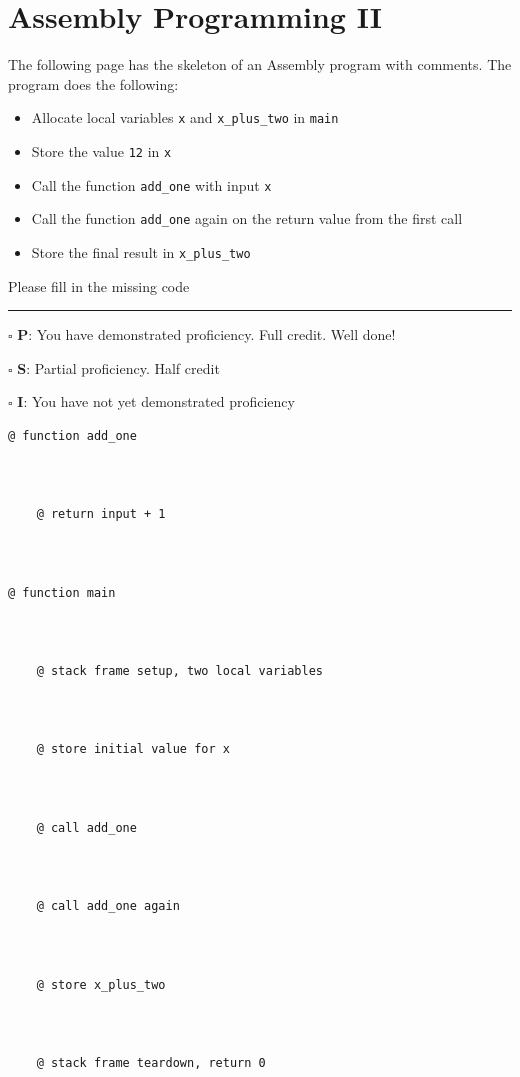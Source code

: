 \documentclass[12pt]{article}
\begin{document}


\section*{Assembly Programming II}

The following page has the skeleton of an Assembly program with comments. The program does the following:
\begin{itemize}
    \item Allocate local variables \texttt{x} and \texttt{x\_plus\_two} in \texttt{main}
    \item Store the value \texttt{12} in \texttt{x}
    \item Call the function \texttt{add\_one} with input \texttt{x}
    \item Call the function \texttt{add\_one} again on the return value from the first call
    \item Store the final result in \texttt{x\_plus\_two}
\end{itemize}

Please fill in the missing code

\vfill

\rule[1ex]{\textwidth}{.1pt}

$\square$ \textbf{P}: You have demonstrated proficiency. Full credit. Well done!

$\square$ \textbf{S}: Partial proficiency. Half credit

$\square$ \textbf{I}: You have not yet demonstrated proficiency

\newpage

\begin{verbatim}
@ function add_one



    @ return input + 1



@ function main


    
    @ stack frame setup, two local variables



    @ store initial value for x



    @ call add_one



    @ call add_one again



    @ store x_plus_two



    @ stack frame teardown, return 0



\end{verbatim}
\end{document}
